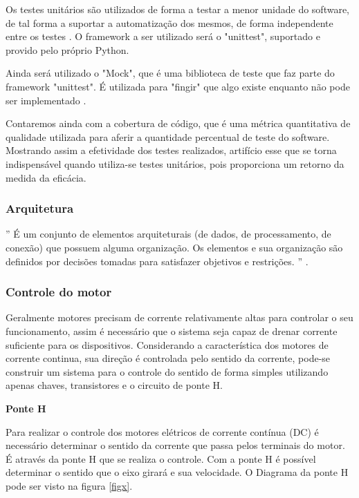Os testes unitários são utilizados de forma a testar a menor unidade do software, de tal forma a suportar a automatização dos mesmos, de forma independente entre os testes \cite{unittest}. O framework a ser utilizado será o "unittest", suportado e provido pelo próprio Python.

Ainda será utilizado o "Mock", que é uma biblioteca de teste que faz parte do framework "unittest". É utilizada para "fingir" que algo existe enquanto não pode ser implementado \cite{unittest_mock}.

Contaremos ainda com a cobertura de código, que é uma métrica quantitativa de qualidade utilizada para aferir a quantidade percentual de teste do software. Mostrando assim a efetividade dos testes realizados, artifício esse que se torna indispensável quando utiliza-se testes unitários, pois proporciona um retorno da medida da eficácia.

\subsubsection{Arquitetura}

'' É um conjunto de elementos arquiteturais (de dados, de processamento, de conexão) que possuem alguma organização. Os elementos e sua organização são definidos por decisões tomadas para satisfazer objetivos e restrições. '' \cite{arquitetura_definition}.

\subsubsection{Controle do motor}

Geralmente motores precisam de corrente relativamente altas para controlar o seu funcionamento, assim é necessário que o sistema seja capaz de drenar corrente suficiente para os dispositivos. Considerando a característica dos motores de corrente continua, sua direção é controlada pelo sentido da corrente, pode-se construir um sistema para o controle do sentido de forma simples utilizando apenas chaves, transistores e o circuito de ponte H.

\textbf{Ponte H}

Para realizar o controle dos motores elétricos de corrente contínua (DC) é necessário determinar o sentido da corrente que passa pelos terminais do motor. É através da ponte H que se realiza o controle. Com a ponte H é possível determinar o sentido que o eixo girará e sua velocidade. O Diagrama da ponte H pode ser visto na figura \ref{figx}.

